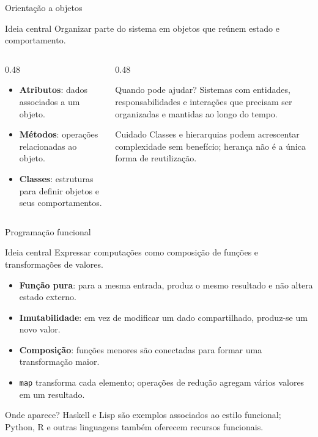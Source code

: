 \documentclass[aspectratio=169,10pt]{beamer}
\begin{document}
\begin{frame}{Orientação a objetos}
  \begin{block}{Ideia central}
    Organizar parte do sistema em objetos que reúnem estado e comportamento.
  \end{block}
  \begin{columns}[T,onlytextwidth]
    \begin{column}{0.48\textwidth}
      \begin{itemize}
        \item \textbf{Atributos}: dados associados a um objeto.
        \item \textbf{Métodos}: operações relacionadas ao objeto.
        \item \textbf{Classes}: estruturas para definir objetos e seus comportamentos.
      \end{itemize}
    \end{column}
    \begin{column}{0.48\textwidth}
      \begin{exampleblock}{Quando pode ajudar?}
        Sistemas com entidades, responsabilidades e interações que precisam ser organizadas e mantidas ao longo do tempo.
      \end{exampleblock}
      \begin{alertblock}{Cuidado}
        Classes e hierarquias podem acrescentar complexidade sem benefício; herança não é a única forma de reutilização.
      \end{alertblock}
    \end{column}
  \end{columns}
\end{frame}

\begin{frame}{Programação funcional}
  \begin{block}{Ideia central}
    Expressar computações como composição de funções e transformações de valores.
  \end{block}
  \begin{itemize}
    \item \textbf{Função pura}: para a mesma entrada, produz o mesmo resultado e não altera estado externo.
    \item \textbf{Imutabilidade}: em vez de modificar um dado compartilhado, produz-se um novo valor.
    \item \textbf{Composição}: funções menores são conectadas para formar uma transformação maior.
    \item \texttt{map} transforma cada elemento; operações de redução agregam vários valores em um resultado.
  \end{itemize}
  \begin{exampleblock}{Onde aparece?}
    Haskell e Lisp são exemplos associados ao estilo funcional; Python, R e outras linguagens também oferecem recursos funcionais.
  \end{exampleblock}
\end{frame}
\end{document}
